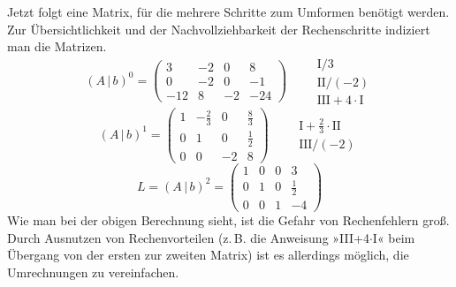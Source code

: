 Jetzt folgt eine Matrix, für die mehrere Schritte zum Umformen benötigt werden. Zur Übersichtlichkeit und der Nachvollziehbarkeit der Rechenschritte indiziert man die Matrizen.
\[ (A\,|\,b)^0 = \left(\begin{array}{ccc|c} 3 & -2 & 0 & 8\\ 0 & -2 & 0 & -1\\ -12 & 8 & -2 & -24 \end{array}\right) \qquad \begin{array}{l} \text{I}/3\\ \text{II}/(-2)\\ \text{III}+4\cdot\text{I} \end{array} \]
\[ (A\,|\,b)^1 = \left(\begin{array}{ccc|c} 1 & -\frac{2}{3} & 0 & \frac{8}{3}\\ 0 & 1 & 0 & \frac{1}{2}\\ 0 & 0 & -2 & 8 \end{array}\right) \qquad \begin{array}{l} \text{I}+\frac{2}{3}\cdot\text{II}\\ \text{III}/(-2) \end{array} \]
\[ L = (A\,|\,b)^2 = \left(\begin{array}{ccc|c} 1 & 0 & 0 & 3\\ 0 & 1 & 0 & \frac{1}{2}\\ 0 & 0 & 1 & -4 \end{array}\right) \]
Wie man bei der obigen Berechnung sieht, ist die Gefahr von Rechenfehlern groß. Durch Ausnutzen von Rechenvorteilen (z.\,B. die Anweisung »III+4$\cdot$I« beim Übergang von der ersten zur zweiten Matrix) ist es allerdings möglich, die Umrechnungen zu vereinfachen.

